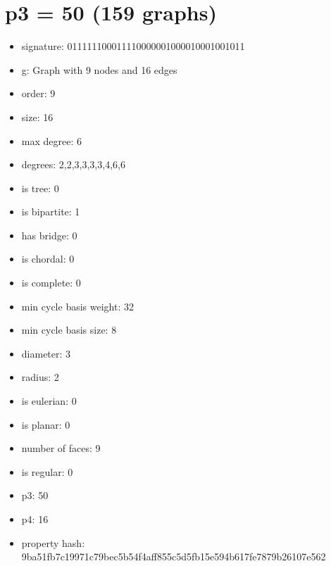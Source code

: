 \chapter{p3 = 50 (159 graphs)}
\newpage\begin{figure}
\end{figure}
\begin{itemize}
\item signature: 011111100011110000001000010001001011
\item g: Graph with 9 nodes and 16 edges
\item order: 9
\item size: 16
\item max degree: 6
\item degrees: 2,2,3,3,3,3,4,6,6
\item is tree: 0
\item is bipartite: 1
\item has bridge: 0
\item is chordal: 0
\item is complete: 0
\item min cycle basis weight: 32
\item min cycle basis size: 8
\item diameter: 3
\item radius: 2
\item is eulerian: 0
\item is planar: 0
\item number of faces: 9
\item is regular: 0
\item p3: 50
\item p4: 16
\item property hash: 9ba51fb7c19971c79bec5b54f4aff855c5d5fb15e594b617fe7879b26107e562
\end{itemize}
